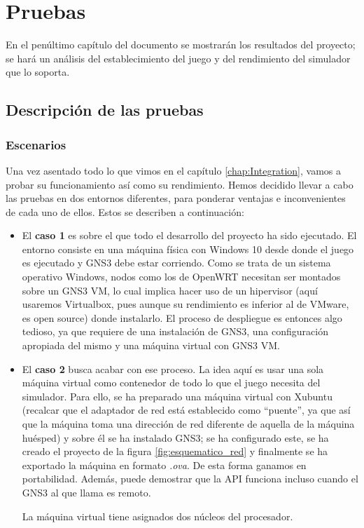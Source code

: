 \chapter{Pruebas}\label{chap:Pruebas}
En el penúltimo capítulo del documento se mostrarán los resultados del proyecto; se hará un análisis del establecimiento del juego y del rendimiento del simulador que lo soporta.

\section{Descripción de las pruebas}
\subsection{Escenarios}
Una vez asentado todo lo que vimos en el capítulo \ref{chap:Integration}, vamos a probar su funcionamiento así como su rendimiento. Hemos decidido llevar a cabo las pruebas en dos entornos diferentes, para ponderar ventajas e inconvenientes de cada uno de ellos. Estos se describen a continuación:
\begin{itemize}
\item El \textbf{caso 1} es sobre el que todo el desarrollo del proyecto ha sido ejecutado. El entorno consiste en una máquina física con Windows 10 desde donde el juego es ejecutado y GNS3 debe estar corriendo. Como se trata de un sistema operativo Windows, nodos como los de OpenWRT necesitan ser montados sobre un GNS3 VM, lo cual implica hacer uso de un hipervisor (aquí usaremos Virtualbox, pues aunque su rendimiento es inferior al de VMware, es open source) donde instalarlo. El proceso de despliegue es entonces algo tedioso, ya que requiere de una instalación de GNS3, una configuración apropiada del mismo y una máquina virtual con GNS3 VM.
\item El \textbf{caso 2} busca acabar con ese proceso. La idea aquí es usar una sola máquina virtual como contenedor de todo lo que el juego necesita del simulador. Para ello, se ha preparado una máquina virtual con Xubuntu (recalcar que el adaptador de red está establecido como ``puente'', ya que así que la máquina toma una dirección de red diferente de aquella de la máquina huésped) y sobre él se ha instalado GNS3; se ha configurado este, se ha creado el proyecto de la figura \ref{fig:esquematico_red} y finalmente se ha exportado la máquina en formato \textit{.ova}. De esta forma ganamos en portabilidad. Además, puede demostrar que la API funciona incluso cuando el GNS3 al que llama es remoto.

La máquina virtual tiene asignados dos núcleos del procesador.
\end{itemize}

